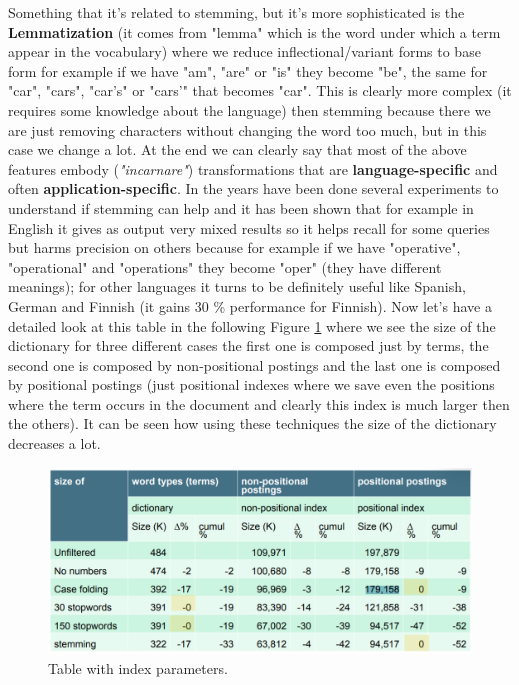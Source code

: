 Something that it's related to stemming, but it's more sophisticated is the \textbf{Lemmatization} (it comes from "lemma" which is the word under which a term appear in the vocabulary) where we reduce inflectional/variant forms to base form for example if we have "am", "are" or "is" they become "be", the same for "car", "cars", "car's" or "cars'" that becomes "car". This is clearly more complex (it requires some knowledge about the language) then stemming because there we are just removing characters without changing the word too much, but in this case we change a lot.\newline
At the end we can clearly say that most of the above features embody (\textit{"incarnare"}) transformations that are \textbf{language-specific} and often \textbf{application-specific}. In the years have been done several experiments to understand if stemming can help and it has been shown that for example in English it gives as output very mixed results so it helps recall for some queries but harms precision on others because for example if we have "operative", "operational" and "operations" they become "oper" (they have different meanings); for other languages it turns to be definitely useful like Spanish, German and Finnish (it gains 30 \% performance for Finnish).\newline
Now let's have a detailed look at this table in the following Figure \ref{fig:tableindex} where we see the size of the dictionary for three different cases the first one is composed just by terms, the second one is composed by non-positional postings and the last one is composed by positional postings (just positional indexes where we save even the positions where the term occurs in the document and clearly this index is much larger then the others). It can be seen how using these techniques the size of the dictionary decreases a lot.
\begin{figure}
    \centering
    \includegraphics[width=0.75\linewidth]{images/tableindex.png}
    \caption{Table with index parameters.}
    \label{fig:tableindex}
\end{figure}
